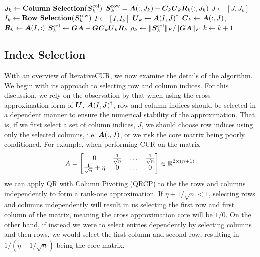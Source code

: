 \begin{algorithm}[h]
\begin{algorithmic}[1]
         \While{$\rho > \epsilon$}
           \State $J_k \leftarrow \textbf{Column Selection} (\boldsymbol{S}^{\rm col}_k)$
           \State $\boldsymbol{S}^{\rm row}_k = \boldsymbol{A}(:,J_k) - \boldsymbol{C}_k \boldsymbol{U}_k \boldsymbol{R}_k(:, J_k)$ \label{alg:right-res} 
           \State $J \leftarrow [J, J_k]$
           \State $I_k \leftarrow \textbf{Row Selection}(\boldsymbol{S}^{\rm row}_k)$
           \State $I \leftarrow [I, I_k]$
           \State $\boldsymbol{U}_k \leftarrow \boldsymbol{A}(I,J)^\dagger$   
           \State $\boldsymbol{C}_k \leftarrow \boldsymbol{A}(:,J)$,  $\boldsymbol{R}_k \leftarrow \boldsymbol{A}(I,:)$ \label{alg:update}
           \State $\boldsymbol{S}^{\rm col}_k \leftarrow \boldsymbol{G} \boldsymbol{A} -\boldsymbol{G} \boldsymbol{C}_k \boldsymbol{U}_k \boldsymbol{R}_k$ 
           \label{alg:left-res}
           \State $\rho_k \leftarrow \|\boldsymbol{S}^{\rm col}_k\|_F /\|\boldsymbol{G}\boldsymbol{A}\|_F$\label{alg:left-res-norm} %
           \State $k \leftarrow k+1$
        \EndWhile   
    \EndProcedure
    \end{algorithmic}
\end{algorithm}


\subsection{Index Selection}
With an overview of IterativeCUR, we now examine the details of the algorithm. We begin with its approach to selecting row and column indices. For this discussion, we rely on the observation by \cite{park2025accuracy} that when using the cross-approximation form of $\boldsymbol{U}$, $\boldsymbol{A}(I,J)^\dagger$, row and column indices should be selected in a dependent manner to ensure the numerical stability of the approximation. 
That is, if we first select a set of column indices, $J$, we should choose row indices using only the selected columns, i.e. $\boldsymbol{A}(:,J)$, or we risk the core matrix being poorly conditioned. For example, when performing CUR on the matrix 
\begin{equation*}
    A = 
    \begin{bmatrix}
    0 & \frac{1}{\sqrt{n}} & \dots & \frac{1}{\sqrt{n}} \\
        \frac{1}{\sqrt{n}}+\eta & 0 & \dots & 0
    \end{bmatrix} \in \mathbb{R}^{2\times (n+1)}
\end{equation*}
we can apply QR with Column Pivoting (QRCP) to the the rows and columns independently to form a rank-one approximation. If $\eta + 1 / \sqrt{n} < 1$, selecting rows and columns independently will result in us selecting the first row and first column of the matrix, meaning the cross approximation core will be $1/0$. On the other hand, if instead we were to select entries dependently by selecting columns and then rows, we would select the first column and second row, resulting in $1 / (\eta + 1/\sqrt{n})$ being the core matrix.


